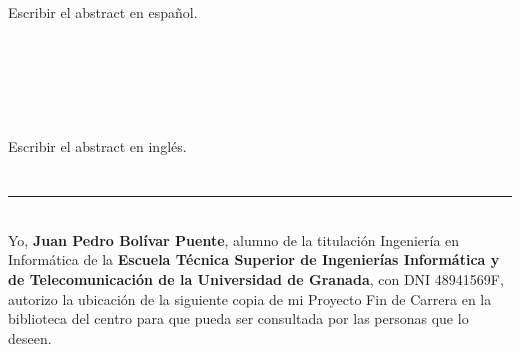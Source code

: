 \chapter*{}
\thispagestyle{empty}
\cleardoublepage

\thispagestyle{empty}



\cleardoublepage
\thispagestyle{empty}
\begin{center}
{\large\bfseries \myTitle}\\
\end{center}
\begin{center}
\myName
\end{center}
\\
\vspace{0.7cm}

\\
\begin{todo}
 Escribir el abstract en español.
\end{todo}

\cleardoublepage
\thispagestyle{empty}
\begin{center}
{\large\bfseries \myTitle}\\
\end{center}
\begin{center}
\myName
\end{center}
\\
\vspace{0.7cm}

\\
\begin{todo}
 Escribir el abstract en inglés.
\end{todo}


\chapter*{}
\thispagestyle{empty}

\noindent\rule[-1ex]{\textwidth}{2pt}\\[4.5ex]

Yo, \textbf{Juan Pedro Bolívar Puente}, alumno de la titulación
Ingeniería en Informática de la \textbf{Escuela Técnica Superior de
  Ingenierías Informática y de Telecomunicación de la Universidad de
  Granada}, con DNI 48941569F, autorizo la ubicación de la siguiente
copia de mi Proyecto Fin de Carrera en la biblioteca del centro para
que pueda ser consultada por las personas que lo deseen.

